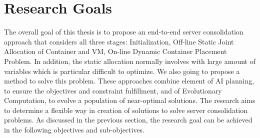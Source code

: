 \section{Research Goals}
The overall goal of this thesis is to propose an end-to-end server consolidation approach that considers all three stages: Initialization, Off-line Static Joint Allocation of Container and VM, On-line Dynamic Container Placement Problem. In addition, the static allocation normally involves with large amount of variables which is particular difficult to optimize. We also going to propose a method to solve this problem.  These approaches combine element of AI planning, to ensure the objectives and constraint fulfillment, and of Evolutionary Computation, to evolve a population of near-optimal solutions. The research aims to determine a flexible way in creation of solutions to solve server consolidation problems. As discussed in the previous section, the research goal can be achieved in the following objectives and sub-objectives.

